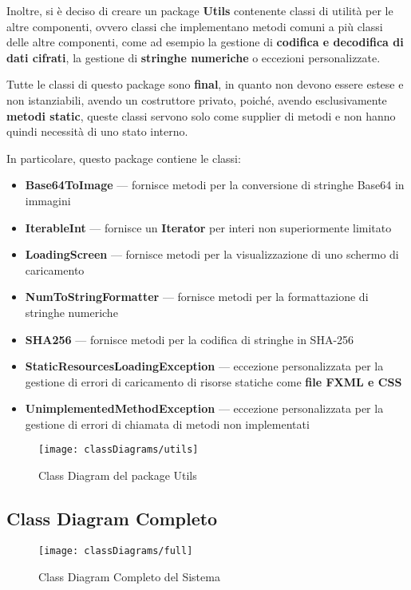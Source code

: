 Inoltre, si è deciso di creare un package \textbf{Utils} contenente classi di utilità
per le altre componenti, ovvero classi che implementano metodi comuni a più classi
delle altre componenti, come ad esempio la gestione di \textbf{codifica e decodifica di dati
cifrati}, la gestione di \textbf{stringhe numeriche} o eccezioni personalizzate.

Tutte le classi di questo package sono \textbf{final}, in quanto non devono essere estese
e non istanziabili, avendo un costruttore privato, poiché, avendo esclusivamente 
\textbf{metodi static}, queste classi servono solo come supplier di metodi e non hanno
quindi necessità di uno stato interno.

In particolare, questo package contiene le classi:

\begin{itemize}
  \item \textbf{Base64ToImage} --- fornisce metodi per la conversione di stringhe Base64 in immagini
  \item \textbf{IterableInt} --- fornisce un \textbf{Iterator} per interi non superiormente limitato
  \item \textbf{LoadingScreen} --- fornisce metodi per la visualizzazione di uno schermo di caricamento
  \item \textbf{NumToStringFormatter} --- fornisce metodi per la formattazione di stringhe numeriche
  \item \textbf{SHA256} --- fornisce metodi per la codifica di stringhe in SHA-256
  \item \textbf{StaticResourcesLoadingException} --- eccezione personalizzata per la gestione di errori 
  di caricamento di risorse statiche come \textbf{file FXML e CSS}
  \item \textbf{UnimplementedMethodException} --- eccezione personalizzata per la gestione di errori
  di chiamata di metodi non implementati
\end{itemize}

\begin{figure}[H]
  \centering
  \texttt{[image: classDiagrams/utils]}
  \caption{Class Diagram del package Utils}
\end{figure}

\newpage

\subsection{Class Diagram Completo}

\begin{figure}[H]
  \centering
  \texttt{[image: classDiagrams/full]}
  \caption{Class Diagram Completo del Sistema}
\end{figure}